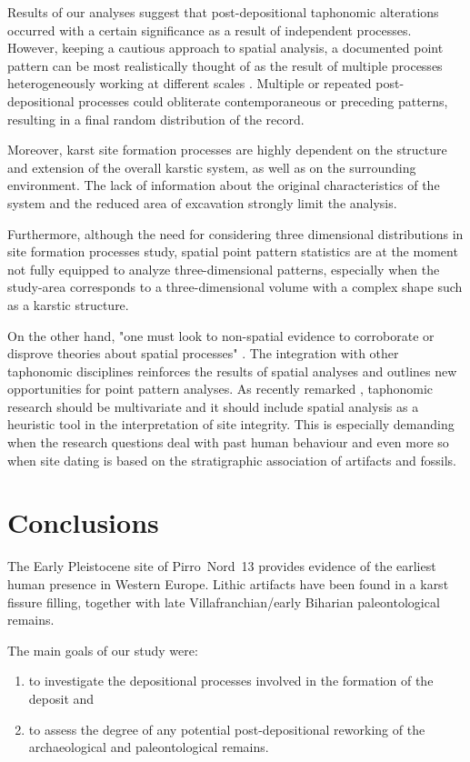 \documentclass[5p,authoryear]{elsarticle} %
\begin{document}
Results of our analyses suggest that post-depositional taphonomic alterations occurred with a certain significance as a result of independent processes. However, keeping a cautious approach to spatial analysis, a documented point pattern can be most realistically thought of as the result of multiple processes heterogeneously working at different scales \citep{Bevan2013}. Multiple or repeated post-depositional processes could obliterate contemporaneous or preceding patterns, resulting in a final random distribution of the record.

Moreover, karst site formation processes are highly dependent on the structure and extension of the overall karstic system, as well as on the surrounding environment. The lack of information about the original characteristics of the system and the reduced area of excavation strongly limit the analysis.

Furthermore, although the need for considering three dimensional distributions in site formation processes study, spatial point pattern statistics are at the moment not fully equipped to analyze three-dimensional patterns, especially when the study-area corresponds to a three-dimensional volume with a complex shape such as a karstic structure.

On the other hand, "one must look to non-spatial evidence to corroborate or disprove theories about spatial processes" \citep[p.~8]{Hodder1976}. The integration with other taphonomic disciplines reinforces the results of spatial analyses and outlines new opportunities for point pattern analyses. As recently remarked \citep{Cobo-Sanchez2014}, taphonomic research should be multivariate \citep{Dominguez-Rodrigo2010} and it should include spatial analysis as a heuristic tool in the interpretation of site integrity. This is especially demanding when the research questions deal with past human behaviour and even more so when site dating is based on the stratigraphic association of artifacts and fossils.

\section{Conclusions}

The Early Pleistocene site of Pirro~Nord~13 provides evidence of the earliest human presence in Western Europe. Lithic artifacts have been found in a karst fissure filling, together with late Villafranchian/early Biharian paleontological remains.

The main goals of our study were:
\begin{enumerate}
  \item to investigate the depositional processes involved in the formation of the deposit and
  \item to assess the degree of any potential post-depositional reworking of the archaeological and paleontological remains.
\end{enumerate}
\end{document}
